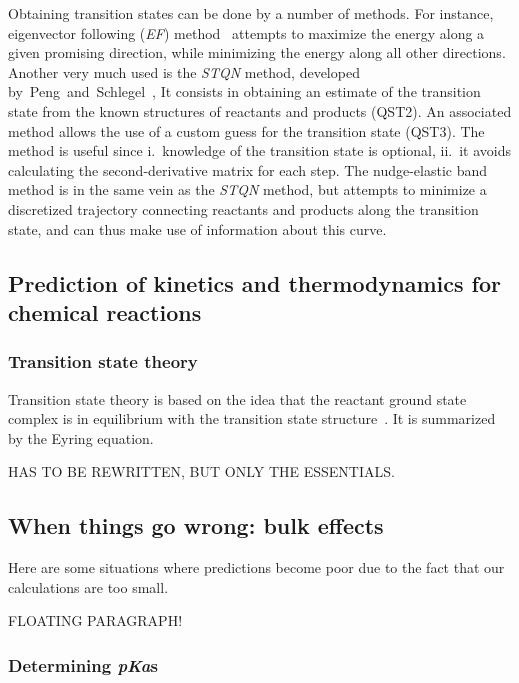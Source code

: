 Obtaining transition states can be done by a number of methods.
For instance, eigenvector following (\emph{EF})
method~\cite{Banerjee_1985,Schlegel_1987,Mauro_2005}
attempts to maximize the energy along a given promising direction, while
minimizing the energy along all other directions.
Another very much used is the \emph{STQN} method, developed
by~Peng~and~Schlegel~\cite{Peng_1993,Peng_1996},
It consists in obtaining an estimate of the transition state from the known
structures of reactants and products (QST2).
An associated method allows the use of a custom guess for the transition state
(QST3).
The method is useful since
i.\ knowledge of the transition state is optional,
ii.\ it avoids calculating the second-derivative matrix for each step.
The nudge-elastic band method is in the same vein as the \emph{STQN} method,
but attempts to minimize a discretized trajectory connecting reactants and
products along the transition state, and can thus make use of information about
this curve.

\subsection{Prediction of kinetics and thermodynamics for chemical reactions}

\subsubsection{Transition state theory}\label{sec:tst}

Transition state theory
is based on the idea that the reactant ground state complex is in equilibrium
with the transition state structure~\cite{TransitionStateTheory}.
It is summarized by the Eyring equation.

HAS TO BE REWRITTEN, BUT ONLY THE ESSENTIALS.\@

\subsection{When things go wrong:
	bulk effects}

Here are some situations where predictions become poor due to the fact that our
calculations are too small.

FLOATING PARAGRAPH!\@

\subsubsection{Determining \emph{pKa}s}\label{sec:pka}


